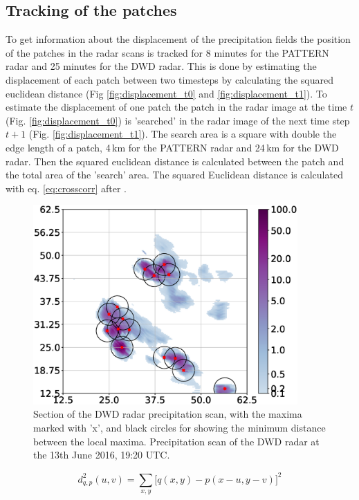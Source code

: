 \documentclass[11pt,twoside,a4paper,fleqn,x11names]{report}
\numberwithin{equation}{chapter}
\numberwithin{figure}{chapter}
\numberwithin{table}{chapter}
\begin{document}
\subsection{Tracking of the patches}
To get information about the displacement of the precipitation fields the position of the patches in the radar scans is tracked for 8 minutes for the PATTERN radar and 25 minutes for the DWD radar. This is done by estimating the displacement of each patch between two timesteps by calculating the squared euclidean distance (Fig \ref{fig:displacement_t0} and \ref{fig:displacement_t1}). To estimate the displacement of one patch the patch in the radar image at the time $t$ (Fig. \ref{fig:displacement_t0}) is 'searched' in the radar image of the next time step $t + 1$ (Fig. \ref{fig:displacement_t1}). The search area is a square with double the edge length of a patch, 4\,km for the PATTERN radar and 24\,km for the DWD radar. Then the squared euclidean distance is calculated between the patch and the total area of the 'search' area. The squared Euclidean distance is calculated with eq. \ref{eq:crosscorr} after \cite{crosscorr}. 
\begin{figure}[!htbp]
	\centering
	\includegraphics[width=0.9\textwidth]{maximaOverviewZoom.eps}
	\caption{Section of the DWD radar precipitation scan, with the maxima marked with 'x', and black circles for showing the minimum distance between the local maxima. Precipitation scan of the DWD radar at the 13th June 2016, 19:20 UTC.}
	\label{fig:maximaOverviewZoom}
\end{figure}
\begin{equation}
d^2_{q,p}(u,v) = \sum_{x,y}^{}\big[q(x,y)-p(x-u,y-v)\big]^2
\label{eq:crosscorr}
\end{equation}
\end{document}
